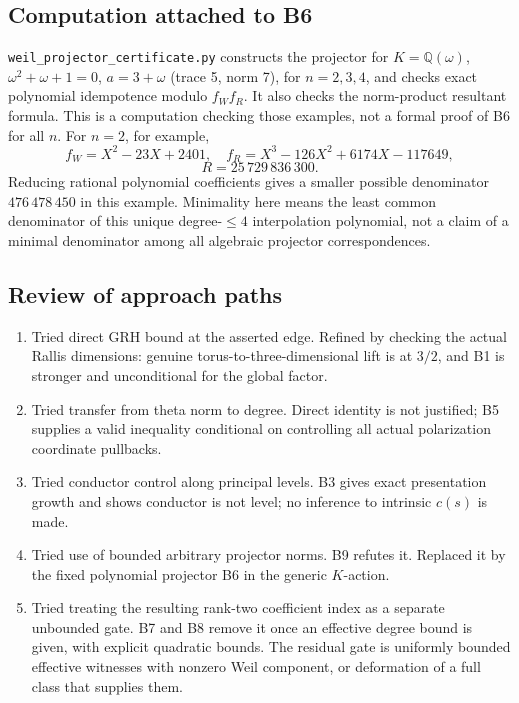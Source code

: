 \subsection{Computation attached to B6}\label{computation-attached-to-b6}

\texttt{weil\_projector\_certificate.py} constructs the projector for \(K=\mathbb Q(\omega)\), \(\omega^2+\omega+1=0\), \(a=3+\omega\) (trace 5, norm 7), for \(n=2,3,4\), and checks exact polynomial idempotence modulo \(f_W f_R\). It also checks the norm-product resultant formula. This is a computation checking those examples, not a formal proof of B6 for all \(n\). For \(n=2\), for example, \[
 f_W=X^2-23X+2401,\quad f_R=X^3-126X^2+6174X-117649,
\] \[
 R=25\,729\,836\,300.
\] Reducing rational polynomial coefficients gives a smaller possible denominator \(476\,478\,450\) in this example. Minimality here means the least common denominator of this unique degree-\(\leq4\) interpolation polynomial, not a claim of a minimal denominator among all algebraic projector correspondences.

\subsection{Review of approach paths}\label{review-of-approach-paths}

\begin{enumerate}
\def\labelenumi{\arabic{enumi}.}
\tightlist
\item
  Tried direct GRH bound at the asserted edge. Refined by checking the actual Rallis dimensions: genuine torus-to-three-dimensional lift is at \(3/2\), and B1 is stronger and unconditional for the global factor.
\item
  Tried transfer from theta norm to degree. Direct identity is not justified; B5 supplies a valid inequality conditional on controlling all actual polarization coordinate pullbacks.
\item
  Tried conductor control along principal levels. B3 gives exact presentation growth and shows conductor is not level; no inference to intrinsic \(c(s)\) is made.
\item
  Tried use of bounded arbitrary projector norms. B9 refutes it. Replaced it by the fixed polynomial projector B6 in the generic \(K\)-action.
\item
  Tried treating the resulting rank-two coefficient index as a separate unbounded gate. B7 and B8 remove it once an effective degree bound is given, with explicit quadratic bounds. The residual gate is uniformly bounded effective witnesses with nonzero Weil component, or deformation of a full class that supplies them.
\end{enumerate}

